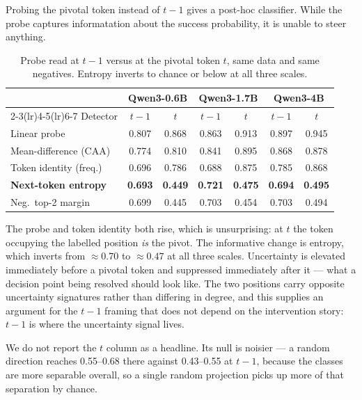 \documentclass{article}
\begin{document}
Probing the pivotal token instead of $t-1$ gives a post-hoc classifier. While the probe 
captures informatation about the success probability, it is unable to steer anything.

\begin{table}[t]
  \centering
  \caption{Probe read at $t-1$ versus at the pivotal token $t$, same data
  and same negatives. Entropy inverts to chance or below at all three
  scales.}
  \label{tab:at-t}
  \begin{tabular}{lcccccc}
    \toprule
    & \multicolumn{2}{c}{Qwen3-0.6B} & \multicolumn{2}{c}{Qwen3-1.7B} & \multicolumn{2}{c}{Qwen3-4B} \\
    \cmidrule(lr){2-3}\cmidrule(lr){4-5}\cmidrule(lr){6-7}
    Detector & $t{-}1$ & $t$ & $t{-}1$ & $t$ & $t{-}1$ & $t$ \\
    \midrule
    Linear probe & 0.807 & 0.868 & 0.863 & 0.913 & 0.897 & 0.945 \\
    Mean-difference (CAA) & 0.774 & 0.810 & 0.841 & 0.895 & 0.868 & 0.878 \\
    Token identity (freq.) & 0.696 & 0.786 & 0.688 & 0.875 & 0.785 & 0.868 \\
    \textbf{Next-token entropy} & \textbf{0.693} & \textbf{0.449} & \textbf{0.721} & \textbf{0.475} & \textbf{0.694} & \textbf{0.495} \\
    Neg.\ top-2 margin & 0.699 & 0.445 & 0.703 & 0.454 & 0.703 & 0.494 \\
    \bottomrule
  \end{tabular}
\end{table}

The probe and token identity both rise, which is unsurprising: at $t$ the
token occupying the labelled position \emph{is} the pivot. The informative
change is entropy, which inverts from $\approx 0.70$ to $\approx 0.47$ at
all three scales. Uncertainty is elevated immediately before a pivotal
token and suppressed immediately after it --- what a decision point being
resolved should look like. The two positions carry opposite uncertainty
signatures rather than differing in degree, and this supplies an argument
for the $t-1$ framing that does not depend on the intervention story:
$t-1$ is where the uncertainty signal lives.

We do not report the $t$ column as a headline. Its null is noisier --- a
random direction reaches 0.55--0.68 there against 0.43--0.55 at $t-1$,
because the classes are more separable overall, so a single random
projection picks up more of that separation by chance.
\end{document}
